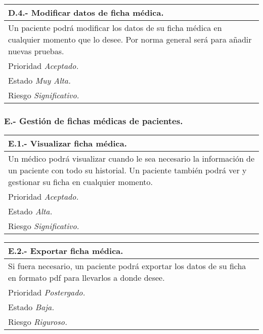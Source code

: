 	\begin{center}
	\begin{tabulary}{15cm}{|L|}
		\hline
			\bf{D.4.- Modificar datos de ficha médica.} \\
		\hline
			Un paciente podrá modificar los datos de su ficha médica en cualquier momento que lo desee. Por norma general será para añadir nuevas pruebas. \\
		\hline
			Prioridad \textit{Aceptado.} \\
		\hline
			Estado \textit{Muy Alta.} \\
		\hline
			Riesgo \textit{Significativo.} \\
		\hline
	\end{tabulary}
	\end{center}

	\subsubsection{E.- Gestión de fichas médicas de pacientes.}

	\begin{center}
	\begin{tabulary}{15cm}{|L|}
		\hline
			\bf{E.1.- Visualizar ficha médica.} \\
		\hline
			Un médico podrá visualizar cuando le sea necesario la información de un paciente con todo su historial. Un paciente también podrá ver y gestionar su ficha en cualquier momento. \\
		\hline
			Prioridad \textit{Aceptado.} \\
		\hline
			Estado \textit{Alta.} \\
		\hline
			Riesgo \textit{Significativo.} \\
		\hline
	\end{tabulary}
	\end{center}

	\begin{center}
	\begin{tabulary}{15cm}{|L|}
		\hline
			\bf{E.2.- Exportar ficha médica.} \\
		\hline
			Si fuera necesario, un paciente podrá exportar los datos de su ficha en formato pdf para llevarlos a donde desee. \\
		\hline
			Prioridad \textit{Postergado.} \\
		\hline
			Estado \textit{Baja.} \\
		\hline
			Riesgo \textit{Riguroso.} \\
		\hline
	\end{tabulary}
	\end{center}

